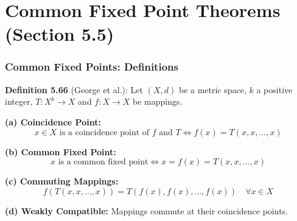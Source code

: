 \documentclass[aspectratio=169,10pt]{beamer}
\begin{document}
\section{Common Fixed Point Theorems (Section 5.5)}

\begin{frame}
\frametitle{Common Fixed Points: Definitions}

\textbf{Definition 5.66} (George et al.): Let $(X, d)$ be a metric space, $k$ a positive integer,
$T: X^k \to X$ and $f: X \to X$ be mappings.

\vspace{0.3cm}

\textbf{(a) Coincidence Point:}
$$x \in X \text{ is a coincidence point of } f \text{ and } T \iff f(x) = T(x, x, \ldots, x)$$

\vspace{0.3cm}

\textbf{(b) Common Fixed Point:}
$$x \text{ is a common fixed point} \iff x = f(x) = T(x, x, \ldots, x)$$

\vspace{0.3cm}

\textbf{(c) Commuting Mappings:}
$$f(T(x,x,\ldots,x)) = T(f(x), f(x), \ldots, f(x)) \quad \forall x \in X$$

\vspace{0.3cm}

\textbf{(d) Weakly Compatible:}
Mappings commute at their coincidence points.

\end{frame}
\end{document}
